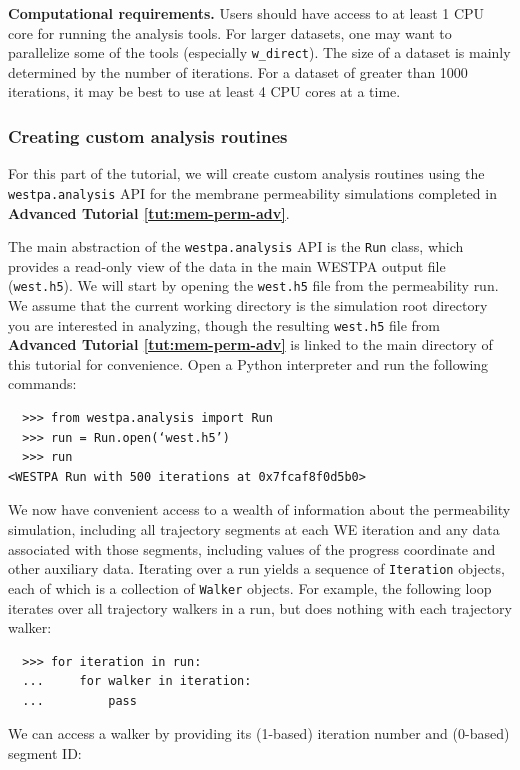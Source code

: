 \textbf{Computational requirements.} Users should have access to at least 1 CPU core for running the analysis tools.
For larger datasets, one may want to parallelize some of the tools (especially \verb|w_direct|).
The size of a dataset is mainly determined by the number of iterations. For a dataset of greater than 1000 iterations, it may be best to use at least 4 CPU cores at a time.

\subsubsection{Creating custom analysis routines}
For this part of the tutorial, we will create custom analysis routines using the \verb|westpa.analysis| API for the membrane permeability simulations completed in \textbf{Advanced Tutorial \ref{tut:mem-perm-adv}}. 

The main abstraction of the \verb|westpa.analysis| API is the \verb|Run| class, which provides a read-only view of the data in the main WESTPA output file (\verb|west.h5|).
We will start by opening the \verb|west.h5| file from the permeability run.
We assume that the current working directory is the simulation root directory you are interested in analyzing, though the resulting \verb|west.h5| file from \textbf{Advanced Tutorial \ref{tut:mem-perm-adv}} is linked to the main directory of this tutorial for convenience.
Open a Python interpreter and run the following commands:

\pagebreak
\begin{verbatim}
  >>> from westpa.analysis import Run
  >>> run = Run.open(‘west.h5’)
  >>> run
<WESTPA Run with 500 iterations at 0x7fcaf8f0d5b0>
\end{verbatim}

We now have convenient access to a wealth of information about the permeability simulation, including all trajectory segments at each WE iteration and any data associated with those segments, including values of the progress coordinate and other auxiliary data.
Iterating over a run yields a sequence of \verb|Iteration| objects, each of which is a collection of \verb|Walker| objects.
For example, the following loop iterates over all trajectory walkers in a run, but does nothing with each trajectory walker:

\begin{verbatim}
  >>> for iteration in run:
  ...     for walker in iteration:
  ...         pass
\end{verbatim}

We can access a walker by providing its (1-based) iteration number and (0-based) segment ID:

